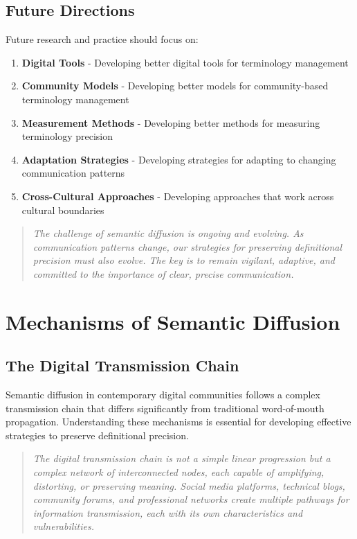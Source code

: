 \documentclass[11pt]{article}
\begin{document}
\subsection{Future Directions}

Future research and practice should focus on:

\begin{enumerate}
\item \textbf{Digital Tools} - Developing better digital tools for terminology management
\item \textbf{Community Models} - Developing better models for community-based terminology management
\item \textbf{Measurement Methods} - Developing better methods for measuring terminology precision
\item \textbf{Adaptation Strategies} - Developing strategies for adapting to changing communication patterns
\item \textbf{Cross-Cultural Approaches} - Developing approaches that work across cultural boundaries
\end{enumerate}

\begin{quote}
\emph{The challenge of semantic diffusion is ongoing and evolving. As communication patterns change, our strategies for preserving definitional precision must also evolve. The key is to remain vigilant, adaptive, and committed to the importance of clear, precise communication.}
\end{quote}

\section{Mechanisms of Semantic Diffusion}

\subsection{The Digital Transmission Chain}

Semantic diffusion in contemporary digital communities follows a complex transmission chain that differs significantly from traditional word-of-mouth propagation. Understanding these mechanisms is essential for developing effective strategies to preserve definitional precision.

\begin{quote}
\emph{The digital transmission chain is not a simple linear progression but a complex network of interconnected nodes, each capable of amplifying, distorting, or preserving meaning. Social media platforms, technical blogs, community forums, and professional networks create multiple pathways for information transmission, each with its own characteristics and vulnerabilities.}
\end{quote}
\end{document}
